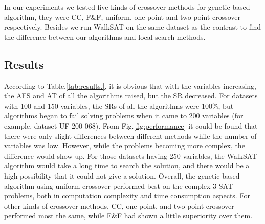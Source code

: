 In our experiments we tested five kinds of crossover methods for genetic-based algorithm, they were CC, F&F, uniform, one-point and two-point crossover respectively. Besides we run WalkSAT on the same dataset as the contrast to find the difference between our algorithms and local search methods.

\subsection{Results}

According to Table.\ref{tab:results.}, it is obvious that with the variables increasing, the AFS and AT of all the algorithms raised, but the SR decreased. For datasets with 100 and 150 variables, the SRs of all the algorithms were 100\%, but algorithms began to fail solving problems when it came to 200 variables (for example, dataset UF-200-068). From Fig.\ref{fig:performance} it could be found that there were only slight differences between different methods while the number of variables was low. However, while the problems becoming more complex, the difference would show up. For those datasets having 250 variables, the WalkSAT algorithm would take a long time to search the solution, and there would be a high possibility that it could not give a solution. Overall, the genetic-based algorithm using uniform crossover performed best on the complex 3-SAT problems, both in computation complexity and time consumption aspects. For other kinds of crossover methods, CC, one-point, and two-point crossover performed most the same, while F&F had shown a little superiority over them.
